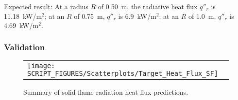 \noindent Expected result: At a radius $R$ of 0.50~m, the radiative heat flux $q''_{r}$ is 11.18~kW/m$^2$; at an $R$ of 0.75~m, $q''_{r}$ is 6.9~kW/m$^2$; at an $R$ of 1.0~m, $q''_{r}$ is 4.69~kW/m$^2$.

\subsubsection*{Validation}

\begin{figure}[!ht]
\begin{center}
\begin{tabular}{l}
\texttt{[image: SCRIPT\_FIGURES/Scatterplots/Target\_Heat\_Flux\_SF]}
\end{tabular}
\end{center}
\caption[Summary of solid flame radiation heat flux predictions]
{Summary of solid flame radiation heat flux predictions.}
\label{Heat_Flux_Solid_Flame_Summary}
\end{figure}
